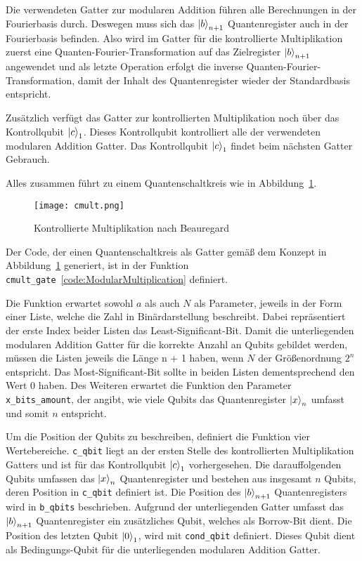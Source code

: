Die verwendeten Gatter zur modularen Addition führen alle Berechnungen in der Fourierbasis durch.
Deswegen muss sich das \(\ket{b}_{n+1}\) Quantenregister auch in der Fourierbasis befinden.
Also wird im Gatter für die kontrollierte Multiplikation zuerst eine Quanten-Fourier-Transformation auf das Zielregister \(\ket{b}_{n+1}\) angewendet und 
als letzte Operation erfolgt die inverse Quanten-Fourier-Transformation, 
damit der Inhalt des Quantenregister wieder der Standardbasis entspricht.

Zusätzlich verfügt das Gatter zur kontrollierten Multiplikation noch über das Kontrollqubit \(\ket{c}_1\).
Dieses Kontrollqubit kontrolliert alle der verwendeten modularen Addition Gatter.
Das Kontrollqubit \(\ket{c}_1\) findet beim nächsten Gatter Gebrauch.

Alles zusammen führt zu einem Quantenschaltkreis wie in Abbildung~\ref{fig:cmult}.
\begin{figure}[H]
  \centering
  \texttt{[image: cmult.png]}
  \caption{Kontrollierte Multiplikation nach Beauregard~\cite{beauregard2003circuit}}
  \label{fig:cmult}
\end{figure}


\bigskip

Der Code, der einen Quantenschaltkreis als Gatter gemäß dem Konzept in Abbildung~\ref{fig:cmult} generiert, 
ist in der Funktion \texttt{cmult_gate}~\ref{code:ModularMultiplication} definiert.

Die Funktion erwartet sowohl \(a\) als auch \(N\) als Parameter, 
jeweils in der Form einer Liste, welche die Zahl in Binärdarstellung beschreibt.
Dabei repräsentiert der erste Index beider Listen das Least-Significant-Bit.
Damit die unterliegenden modularen Addition Gatter für die korrekte Anzahl an Qubits gebildet werden, 
müssen die Listen jeweils die Länge n + 1 haben, wenn \(N\) der Größenordnung \(2^n\) entspricht.
Das Most-Significant-Bit sollte in beiden Listen dementsprechend den Wert \(0\) haben.
Des Weiteren erwartet die Funktion den Parameter \texttt{x_bits_amount}, der angibt, 
wie viele Qubits das Quantenregister \(\ket{x}_n\) umfasst 
und somit \(n\) entspricht. 

Um die Position der Qubits zu beschreiben, 
definiert die Funktion vier Wertebereiche.
\texttt{c_qbit} liegt an der ersten Stelle des kontrollierten Multiplikation Gatters und 
ist für das Kontrollqubit \(\ket{c}_1\) vorhergesehen.
Die darauffolgenden Qubits umfassen das \(\ket{x}_n\) Quantenregister und bestehen aus insgesamt \(n\) Qubits, 
deren Position in \texttt{c_qbit} definiert ist.
Die Position des \(\ket{b}_{n+1}\) Quantenregisters wird in \texttt{b_qbits} beschrieben.
Aufgrund der unterliegenden Gatter umfasst das \(\ket{b}_{n+1}\) Quantenregister ein zusätzliches Qubit, 
welches als Borrow-Bit dient.
Die Position des letzten Qubit \(\ket{0}_1\), 
wird mit \texttt{cond_qbit} definiert.
Dieses Qubit dient als Bedingungs-Qubit für die unterliegenden modularen Addition Gatter.

